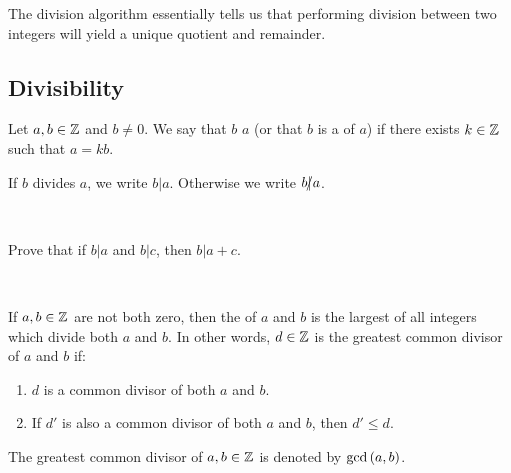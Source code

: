 \documentclass[11pt,fleqn,dvipsnames,usenames]{article}
\newcommand{\p}{\noindent}
\begin{document}
\p The division algorithm essentially tells us that performing division between two integers will yield a unique quotient and remainder.
\vsp

\subsection{Divisibility}

\begin{definition*} Let $a,b\in\mathbb{Z}$ and $b\neq 0$.  We say that $b$  $a$ (or that $b$ is a  of $a$) if there exists $k\in\mathbb{Z}$ such that $a = kb$.
\end{definition*}
\vsp

\notation If $b$ divides $a$, we write $b | a$.  Otherwise we write $b|\kern-0.9ex{/} a$.
\vsp

\begin{examples*}~
\vspace{2cm}

\end{examples*}
\newpage

\begin{example*}
Prove that if $b|a$ and $b|c$, then $b|a+c$.
\end{example*}
%
\begin{solution}~
\vspace{3cm}

\end{solution}
%
\begin{definition*} If $a,b\in\mathbb{Z}$ are not both zero, then the  of $a$ and $b$ is the largest \nolinebreak of all integers which divide both $a$ and $b$.  In other words, $d\in\mathbb{Z}$ is the greatest common divisor of $a$ and \nolinebreak $b$ \nolinebreak if:
\begin{enumerate}[(1)]
\item $d$ is a common divisor of both $a$ and $b$.
\item If $d'$ is also a common divisor of both $a$ and $b$, then $d'\leq d$.
\end{enumerate}
\end{definition*}
\vsp

\notation The greatest common divisor of $a,b\in\mathbb{Z}$ is denoted by $\text{gcd}\left(a,b\right)$.
\vsp
\end{document}
